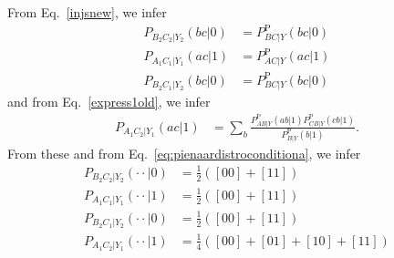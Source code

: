 \documentclass[aps,english,10pt,superscriptaddress,onecolumn,twoside,longbibliography,pra,floatfix,fleqn,nofootinbib]{revtex4-1}%
\theoremstyle{definition}
\begin{document}
From Eq.~\eqref{injsnew}, we infer
\begin{align}
P_{B_2 C_2 |Y_2}(bc| 0)&= P^{\text{P}}_{BC|Y}(bc|0) \nonumber\\
P_{A_1 C_1  |Y_1}(ac|1)&= P^{\text{P}}_{AC|Y}(ac|1)\nonumber\\
P_{B_2 C_1 |Y_2}(bc|0)&= P^{\text{P}}_{BC|Y}(bc|0) 
\end{align} 
and from Eq.~\eqref{express1old}, we infer
\begin{align}
P_{A_1 C_2 |Y_1}(ac|1)  &=\sum_{b} \frac{P^{\text{P}}_{A B |Y}(a b| 1) P^{\text{P}}_{C B| Y}(c b |1) }{P^{\text{P}}_{B |Y}(b |1)}.
\end{align}
From these and from Eq.~\eqref{eq:pienaardistroconditiona}, we infer
\begin{align}
P_{B_2 C_2 |Y_2}(\cdot \cdot| 0)&=  \frac{1}{2}([00]+[11])\label{inj1}\\
P_{A_1 C_1  |Y_1}(\cdot \cdot| 1)&=  \frac{1}{2}([00]+[11]) \label{inj2}\\
P_{B_2 C_1 |Y_2}(\cdot \cdot| 0)&=  \frac{1}{2}([00]+[11])\label{inj3} \\
P_{A_1 C_2 |Y_1}(\cdot \cdot|1)  &=  \frac{1}{4}([00]+[01]+[10]+[11])\label{inj4}
\end{align} 
\end{document}
